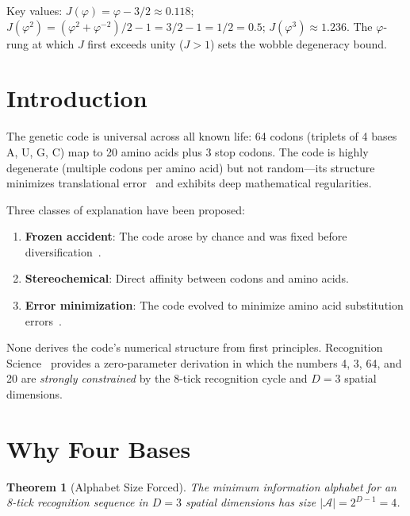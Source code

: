 \documentclass[12pt,a4paper]{article}
\newtheorem{theorem}{Theorem}[section]
\theoremstyle{definition}
\theoremstyle{remark}
\begin{document}
\noindent Key values: $J(\varphi)=\varphi-3/2\approx 0.118$;
$J(\varphi^2)=(\varphi^2+\varphi^{-2})/2-1=3/2-1=1/2=0.5$;
$J(\varphi^3)\approx 1.236$.  The $\varphi$-rung at which $J$
first exceeds unity ($J > 1$) sets the wobble degeneracy bound.

\section{Introduction}
\label{sec:intro}

The genetic code is universal across all known life: 64 codons
(triplets of 4 bases A, U, G, C) map to 20 amino acids plus 3 stop
codons.  The code is highly degenerate (multiple codons per amino acid)
but not random---its structure minimizes translational
error~\cite{HaigHurst1991} and exhibits deep mathematical regularities.

Three classes of explanation have been proposed:
\begin{enumerate}
  \item \textbf{Frozen accident}: The code arose by chance and was
  fixed before diversification~\cite{Crick1968}.
  \item \textbf{Stereochemical}: Direct affinity between codons and
  amino acids.
  \item \textbf{Error minimization}: The code evolved to minimize
  amino acid substitution errors~\cite{HaigHurst1991}.
\end{enumerate}

None derives the code's numerical structure from first principles.
Recognition Science~\cite{RS_Axioms} provides a zero-parameter
derivation in which the numbers 4, 3, 64, and 20 are \emph{strongly
constrained} by the 8-tick recognition cycle and $D = 3$ spatial
dimensions.

\section{Why Four Bases}
\label{sec:four-bases}

\begin{theorem}[Alphabet Size Forced]
\label{thm:alphabet}
The minimum information alphabet for an 8-tick recognition sequence in
$D = 3$ spatial dimensions has size $|\mathcal{A}| = 2^{D-1} = 4$.
\end{theorem}
\end{document}
